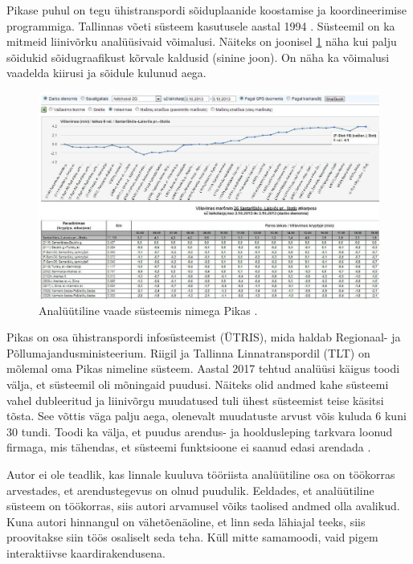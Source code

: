 Pikase puhul on tegu ühistranspordi sõiduplaanide koostamise ja koordineerimise programmiga. Tallinnas võeti süsteem kasutusele aastal 1994 \cite{merakas_projects}. Süsteemil on ka mitmeid liinivõrku analüüsivaid võimalusi. Näiteks on joonisel \ref{fig:pikasLeedu} näha kui palju sõidukid sõidugraafikust kõrvale kaldusid (sinine joon). On näha ka võimalusi vaadelda kiirusi ja sõidule kulunud aega. 

\begin{figure}[h!]
    \centering
    \includegraphics[width=1\textwidth]{figures/pikasLeedu.jpg}
    \caption{Analüütiline vaade süsteemis nimega Pikas \cite{merakas_pikas}.}
    \label{fig:pikasLeedu}
\end{figure}


Pikas on osa ühistranspordi infosüsteemist (ÜTRIS), mida haldab Regionaal- ja Põllumajandusministeerium. Riigil ja Tallinna Linnatranspordil (TLT) on mõlemal oma Pikas nimeline süsteem. Aastal 2017 tehtud analüüsi käigus toodi välja, et süsteemil oli mõningaid puudusi. Näiteks olid andmed kahe süsteemi vahel dubleeritud ja liinivõrgu muudatused tuli ühest süsteemist teise käsitsi tõsta. See võttis väga palju aega, olenevalt muudatuste arvust võis kuluda 6 kuni 30 tundi. Toodi ka välja, et puudus arendus- ja hooldusleping tarkvara loonud firmaga, mis tähendas, et süsteemi funktsioone ei saanud edasi arendada \cite{tallinn_infosusteem_2017}. 

Autor ei ole teadlik, kas linnale kuuluva tööriista analüütiline osa on töökorras arvestades, et arendustegevus on olnud puudulik. Eeldades, et analüütiline süsteem on töökorras, siis autori arvamusel võiks taolised andmed olla avalikud. Kuna autori hinnangul on vähetõenäoline, et linn seda lähiajal teeks, siis proovitakse siin töös osaliselt seda teha. Küll mitte samamoodi, vaid pigem interaktiivse kaardirakendusena.

